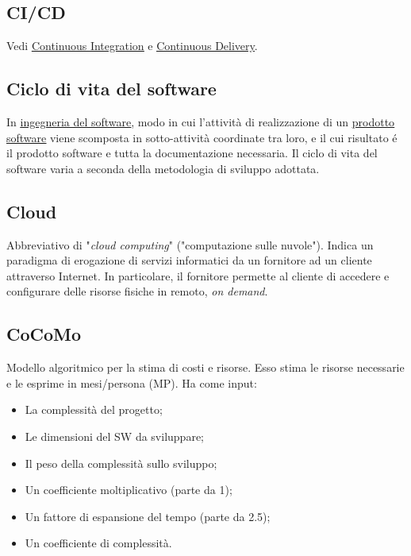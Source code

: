 	\subsection{CI/CD}
	\label{sec:cicd}
	Vedi \underline{\hyperref[sec:continuousintegration]{Continuous Integration}} e \underline{\hyperref[sec:continuousdelivery]{Continuous Delivery}}.

	\subsection{Ciclo di vita del software}
	\label{sec:ciclodivita}
	In \underline{\hyperref[sec:swe]{ingegneria del software}}, modo in cui l'attività di realizzazione di un \underline{\hyperref[sec:prodottosoftware]{prodotto software}} viene scomposta in sotto-attività coordinate tra loro, e il cui risultato é il prodotto software e tutta la documentazione necessaria. Il ciclo di vita del software varia a seconda della metodologia di sviluppo adottata.


	\subsection{Cloud}
	\label{sec:cloud}
	Abbreviativo di "\emph{cloud computing}" ("computazione sulle nuvole"). Indica un paradigma di erogazione di servizi informatici da un fornitore ad un cliente attraverso Internet. In particolare, il fornitore permette al cliente di accedere e configurare delle risorse fisiche in remoto, \emph{on demand}.

	\subsection{CoCoMo}
	\label{sec:cocomo}
	Modello algoritmico per la stima di costi e risorse. Esso stima le risorse necessarie e le esprime in mesi/persona (MP). Ha come input:
	\begin{itemize}
	\item La complessità del progetto;
	\item Le dimensioni del SW da sviluppare;
	\item Il peso della complessità sullo sviluppo;
	\item Un coefficiente moltiplicativo (parte da 1);
	\item Un fattore di espansione del tempo (parte da 2.5);
	\item Un coefficiente di complessità.
	\end{itemize}

